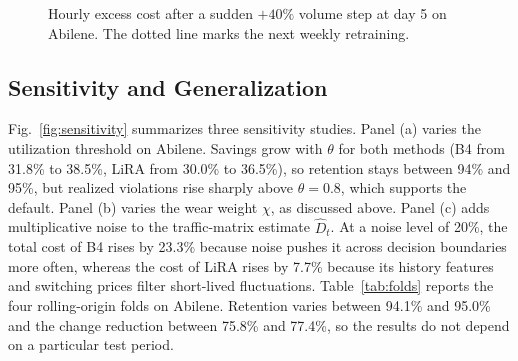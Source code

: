 \documentclass[journal]{IEEEtran}
\begin{document}
\begin{figure}[t]
\centering
{}
\caption{Hourly excess cost after a sudden $+40\%$ volume step at day 5 on Abilene. The dotted line marks the next weekly retraining.}
\label{fig:drift}
\end{figure}

\subsection{Sensitivity and Generalization}

Fig.~\ref{fig:sensitivity} summarizes three sensitivity studies. Panel (a) varies the utilization threshold on Abilene. Savings grow with $\theta$ for both methods (B4 from 31.8\% to 38.5\%, LiRA from 30.0\% to 36.5\%), so retention stays between 94\% and 95\%, but realized violations rise sharply above $\theta=0.8$, which supports the default. Panel (b) varies the wear weight $\chi$, as discussed above. Panel (c) adds multiplicative noise to the traffic-matrix estimate $\hat{D}_t$. At a noise level of 20\%, the total cost of B4 rises by 23.3\% because noise pushes it across decision boundaries more often, whereas the cost of LiRA rises by 7.7\% because its history features and switching prices filter short-lived fluctuations. Table~\ref{tab:folds} reports the four rolling-origin folds on Abilene. Retention varies between 94.1\% and 95.0\% and the change reduction between 75.8\% and 77.4\%, so the results do not depend on a particular test period.
\end{document}
